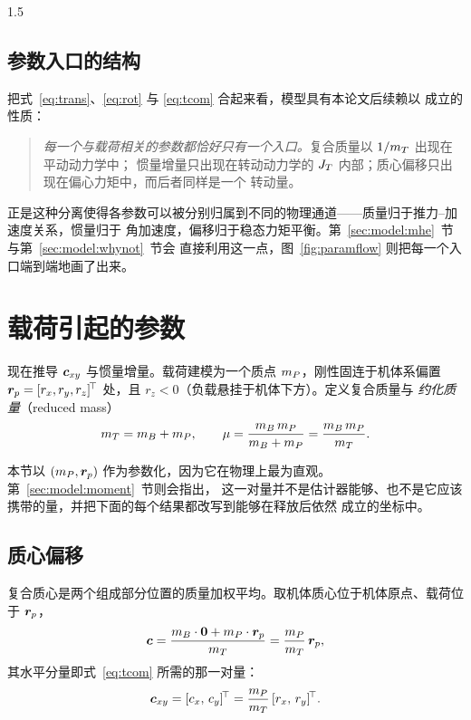 \begin{spacing}{1.5}
\subsection{参数入口的结构}\label{sec:model:entry}

把式~\eqref{eq:trans}、\eqref{eq:rot} 与 \eqref{eq:tcom} 合起来看，模型具有本论文后续赖以
成立的性质：

\begin{quote}
\emph{每一个与载荷相关的参数都恰好只有一个入口。}复合质量以 $1/m_T$ 出现在平动动力学中；
惯量增量只出现在转动动力学的 $J_T$ 内部；质心偏移只出现在偏心力矩中，而后者同样是一个
转动量。
\end{quote}

正是这种分离使得各参数可以被分别归属到不同的物理通道——质量归于推力--加速度关系，惯量归于
角加速度，偏移归于稳态力矩平衡。第~\ref{sec:model:mhe}~节与第~\ref{sec:model:whynot}~节会
直接利用这一点，图~\ref{fig:paramflow} 则把每一个入口端到端地画了出来。

\section{载荷引起的参数}\label{sec:model:payload}

现在推导 $\bm{c}_{xy}$ 与惯量增量。载荷建模为一个质点 $m_P$，刚性固连于机体系偏置
$\bm{r}_p = [r_x, r_y, r_z]^{\!\top}$ 处，且 $r_z < 0$（负载悬挂于机体下方）。定义复合质量与
\emph{约化质量}（reduced mass）
\begin{equation}
m_T = m_B + m_P,
\qquad
\mu = \frac{m_B\, m_P}{m_B + m_P} = \frac{m_B\, m_P}{m_T}.
\label{eq:mu}
\end{equation}

本节以 $(m_P,\bm{r}_p)$ 作为参数化，因为它在物理上最为直观。第~\ref{sec:model:moment}~节则会指出，
这一对量并不是估计器能够、也不是它应该携带的量，并把下面的每个结果都改写到能够在释放后依然
成立的坐标中。

\subsection{质心偏移}\label{sec:model:com}

复合质心是两个组成部分位置的质量加权平均。取机体质心位于机体原点、载荷位于 $\bm{r}_p$，
\begin{equation}
\bm{c} = \frac{m_B \cdot \bm{0} + m_P \cdot \bm{r}_p}{m_T}
= \frac{m_P}{m_T}\, \bm{r}_p ,
\label{eq:rc}
\end{equation}
其水平分量即式~\eqref{eq:tcom} 所需的那一对量：
\begin{equation}
\bm{c}_{xy} = [c_x,\, c_y]^{\!\top} = \frac{m_P}{m_T}\, [r_x,\, r_y]^{\!\top}.
\label{eq:cxy}
\end{equation}


\end{spacing}
